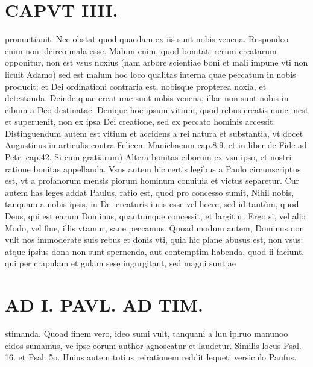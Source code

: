 \documentclass{article}
\begin{document}
\begin{pages}
\section*{CAPVT  IIII. }
\marginpar{[ p.1 ]}\pstart pronuntiauit. Nec obstat quod quaedam ex iis sunt nobis venena. Respondeo enim non idcirco mala esse. Malum enim, quod bonitati rerum creatarum opponitur, non est vsus noxius (nam arbore scientiae boni et mali impune vti non licuit Adamo) sed est malum hoc loco qualitas interna quae peccatum in nobis producit: et Dei ordinationi contraria est, nobisque propterea noxia, et detestanda. Deinde quae creaturae sunt nobis venena, illae non sunt nobis in cibum a Deo destinatae. Denique hoc ipsum vitium, quod rebus creatis nunc inest et superuenit, non ex ipsa Dei creatione, sed ex peccato hominis accessit. Distinguendum autem est vitium et accidens a rei natura et substantia, vt docet Augustinus in articulis contra Felicem Manichaeum cap.8.9. et in liber  de Fide ad Petr. cap.42.  \pend\pstart Si cum gratiarum) Altera bonitas ciborum ex vsu ipso, et nostri ratione bonitas appellanda. Vsus autem hic certis legibus a Paulo circunscriptus est, vt a profanorum mensis piorum hominum conuiuia et victus separetur. Cur autem has leges addat Paulus, ratio est, quod pro concesso sumit, Nihil nobis, tanquam a nobis ipsis, in Dei creaturis iuris esse vel licere, sed id tantùm, quod Deus, qui est earum Dominus, quantumque concessit, et largitur. Ergo si, vel alio Modo, vel fine, illis vtamur, sane peccamus. Quoad modum autem, Dominus non vult nos immoderate suis rebus et donis vti, quia hic plane abusus est, non vsus: atque  ipsius dona non sunt spernenda, aut contemptim habenda, quod ii faciunt, qui per crapulam et gulam sese ingurgitant, sed magni sunt ae\pend
\section*{AD I. PAVL. AD TIM. }
\marginpar{[ p.Io ]}\pstart stimanda. Quoad finem vero, ideo sumi vult, tanquani a luu iplruo manunoo cidos sumamus, ve ipse eorum author agnoscatur et laudetur.  \pend\pstart Similis locus Psal. 16. et Psal. 5o. Huius autem totius reirationem reddit lequeti versiculo Paufus.  \pend
{}
{}

\end{pages}
\end{document}
